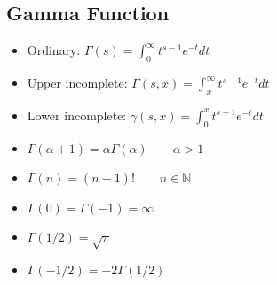 \documentclass[landscape]{article}
\begin{document}
\begin{multicols*}{2}
%
%
%
%
%
%
%
%

\subsection{Gamma Function}
\label{sec:math:gamma}

\begin{itemize}
  \item Ordinary:
    $\displaystyle\Gamma(s) = \int_0^\infty t^{s-1} e^{-t}dt$
  \item Upper incomplete:
    $\displaystyle\Gamma(s,x) = \int_x^\infty t^{s-1} e^{-t}dt$
  \item Lower incomplete:
    $\displaystyle\gamma(s,x) = \int_0^x t^{s-1} e^{-t}dt$
  \item $\Gamma(\alpha + 1) = \alpha \Gamma(\alpha) \qquad \alpha>1$
  \item $\Gamma(n) = (n-1)! \qquad n \in \mathbb N$
  \item $\Gamma(0) = \Gamma(-1) = \infty$
  \item $\Gamma(1/2) = \sqrt{\pi}$
  \item $\Gamma(-1/2) = -2 \Gamma(1/2)$
\end{itemize}


\end{multicols*}
\end{document}
